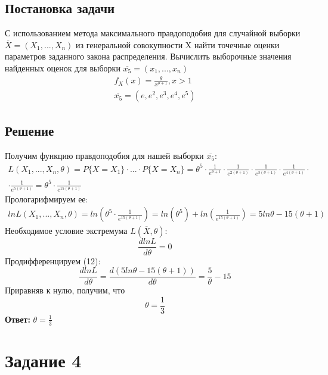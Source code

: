 \subsection*{Постановка задачи}
С использованием метода максимального правдоподобия для случайной выборки $\overline{X} = (X_1, . . . , X_n)$ из генеральной совокупности X найти точечные оценки параметров заданного
закона распределения. Вычислить выборочные значения найденных оценок для выборки $\overline{x_5} = (x_1, . . . , x_n)$
\begin{eqnarray}
f_X(x) = \frac{\theta}{x^{\theta+1}}, x>1 \\
\overline{x_5} = (e, e^2,e^3,e^4,e^5)
\end{eqnarray}
\subsection*{Решение}
Получим функцию правдоподобия для нашей выборки $\overline{x_5}$:
\begin{eqnarray}
L(X_1,...,X_n, \theta) = P \{X=X_1\} \cdot ... \cdot P \{X=X_n\} = \theta^5 \cdot \frac{1}{e^{\theta+1}} \cdot \frac{1}{e^{2(\theta+1)}} \cdot \frac{1}{e^{3(\theta+1)}} \cdot \frac{1}{e^{4(\theta+1)}} \cdot \\ \nonumber \cdot \frac{1}{e^{5(\theta+1)}} = \theta^5 \cdot\frac{1}{e^{15(\theta+1)}}
\end{eqnarray}
Прологарифмируем ее:
\begin{eqnarray}
lnL(X_1,...,X_n, \theta) = ln \left(\theta^5 \cdot\frac{1}{e^{15(\theta+1)}}\right) = ln(\theta^5) + ln\left(\frac{1}{e^{15(\theta+1)}}\right) = 5ln\theta - 15(\theta+1)
\end{eqnarray}
Необходимое условие экстремума $L(\overline{X}, \theta)$:
\begin{equation}
\frac{dlnL}{d\theta}=0
\end{equation}
Продифференцируем (12):
\begin{equation}
\frac{dlnL}{d\theta}=\frac{d(5ln\theta - 15(\theta+1))}{d\theta} =\frac{5}{\theta}-15
\end{equation}
Приравняв к нулю, получим, что
\begin{equation}
{\theta}=\frac{1}{3}
\end{equation}
\textbf{Ответ:} ${\theta}=\frac{1}{3}$

\section*{Задание 4}
